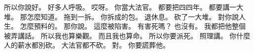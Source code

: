 \hypertarget{c01:cue:3508}{}所以你說好。
\hypertarget{c01:cue:3509}{}好多人呼吸。
\hypertarget{c01:cue:3510}{}哎呀。
\hypertarget{c01:cue:3511}{}你當大法官。
\hypertarget{c01:cue:3512}{}都要把四四年。
\hypertarget{c01:cue:3513}{}都要講一大堆。
\hypertarget{c01:cue:3514}{}那怎麼知道。
\hypertarget{c01:cue:3515}{}拖到一拆。
\hypertarget{c01:cue:3516}{}你拆成的包。
\hypertarget{c01:cue:3517}{}退休息。
\hypertarget{c01:cue:3518}{}砍了一大堆。
\hypertarget{c01:cue:3519}{}對你說人生。
\hypertarget{c01:cue:3520}{}怎麼預料的。
\hypertarget{c01:cue:3521}{}那你說。
\hypertarget{c01:cue:3522}{}這麼被陷害。
\hypertarget{c01:cue:3523}{}有害死嗎？
\hypertarget{c01:cue:3524}{}也沒有。
\hypertarget{c01:cue:3525}{}我都把他整個被弄講話。
\hypertarget{c01:cue:3526}{}所以我也算樂觀。
\hypertarget{c01:cue:3527}{}而且我也算命。
\hypertarget{c01:cue:3528}{}所以你要派死。
\hypertarget{c01:cue:3529}{}照理講。
\hypertarget{c01:cue:3530}{}你什麼人的薪水都別砍。
\hypertarget{c01:cue:3531}{}大法官都不砍。
\hypertarget{c01:cue:3532}{}對。
\hypertarget{c01:cue:3533}{}你要謊葬他。

